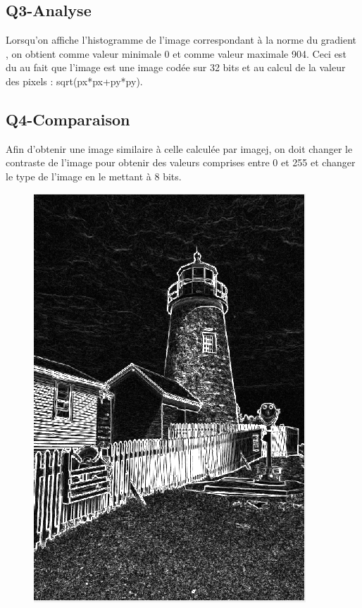 \documentclass[a4paper,12pt]{report}
\begin{document}
\subsection*{Q3-Analyse}
Lorsqu'on affiche l'histogramme de l'image correspondant à la norme du gradient , on obtient comme valeur minimale 0 et comme valeur maximale 904. Ceci est du au fait que l'image est une image codée sur 32 bits et au calcul de la valeur des pixels : sqrt(px*px+py*py).
\subsection*{Q4-Comparaison}
Afin d'obtenir une image similaire à celle calculée par imagej, on doit changer le contraste de l'image pour obtenir des valeurs comprises entre 0 et 255 et changer le type de l'image en le mettant à 8 bits.
\begin{figure}[!ht]
	\begin{center}
		\includegraphics[scale=0.4]{./imageResultats/norme_gradient_q4.png}

\end{center}
\end{figure}
\end{document}
